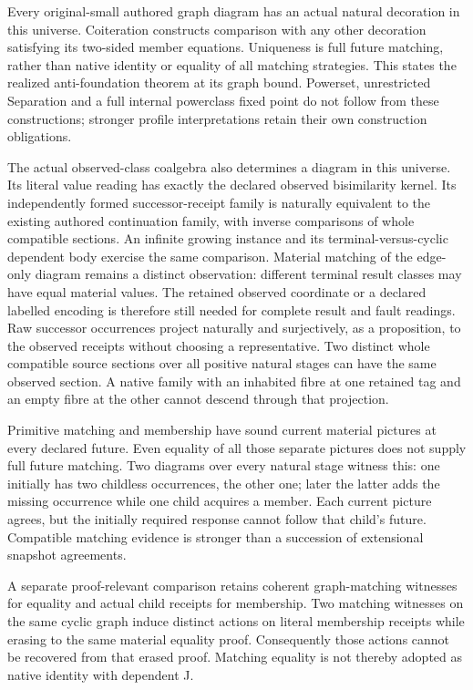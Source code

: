 \documentclass[11pt]{article}
\theoremstyle{definition}
\theoremstyle{remark}
\begin{document}
Every original-small authored graph diagram has an actual natural
decoration in this universe. Coiteration constructs comparison with any
other decoration satisfying its two-sided member equations. Uniqueness
is full future matching, rather than native identity or equality of all
matching strategies. This states the realized anti-foundation theorem
at its graph bound. Powerset, unrestricted Separation and a full internal
powerclass fixed point do not follow from these constructions; stronger
profile interpretations retain their own construction obligations.

The actual observed-class coalgebra also determines a diagram in this
universe. Its literal value reading has exactly the declared observed
bisimilarity kernel. Its independently formed successor-receipt family
is naturally equivalent to the existing authored continuation family,
with inverse comparisons of whole compatible sections. An infinite
growing instance and its terminal-versus-cyclic dependent body exercise
the same comparison. Material matching of the edge-only diagram remains
a distinct observation: different terminal result classes may have equal
material values. The retained observed coordinate or a declared labelled
encoding is therefore still needed for complete result and fault readings.
Raw successor occurrences project naturally and surjectively, as a proposition,
to the observed receipts without choosing a representative. Two distinct whole
compatible source sections over all positive natural stages can have the same
observed section. A native family with an inhabited fibre at one retained tag
and an empty fibre at the other cannot descend through that projection.

Primitive matching and membership have sound current material pictures
at every declared future. Even equality of all those separate pictures
does not supply full future matching. Two diagrams over every natural
stage witness this: one initially has two childless occurrences, the
other one; later the latter adds the missing occurrence while one child
acquires a member. Each current picture agrees, but the initially required
response cannot follow that child's future. Compatible matching evidence
is stronger than a succession of extensional snapshot agreements.

A separate proof-relevant comparison retains coherent graph-matching
witnesses for equality and actual child receipts for membership.  Two
matching witnesses on the same cyclic graph induce distinct actions on
literal membership receipts while erasing to the same material equality
proof.  Consequently those actions cannot be recovered from that erased
proof.  Matching equality is not thereby adopted as native identity with
dependent J.
\end{document}
